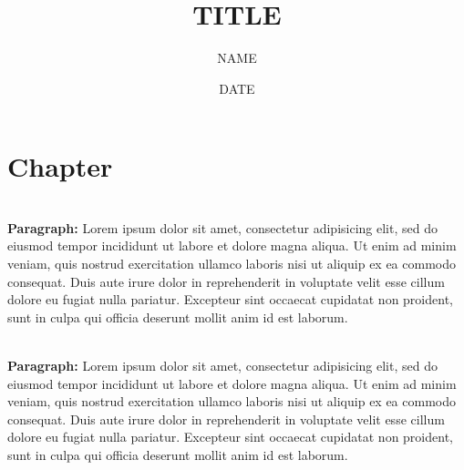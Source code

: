 \documentclass[a5paper, 10pt]{book}
\title{TITLE}
\author{NAME}
\date{DATE}
\newif\ifBgUse
\renewcommand\maketitle[0]{


\fontsize{11pt}{11pt}\selectfont

\tableofcontents
}
\renewcommand{\paragraph}[1]{\mbox{}\\ \textbf{#1:} \hspace{0.15em}}
\begin{document}

    \linespread{1}
	\graphicspath{ {./img/} }

	\renewcommand*\rmdefault{iwona}


	\BgUsefalse

	\maketitle



	\chapter{Chapter}
	\BgUsetrue

	\paragraph{Paragraph} Lorem ipsum dolor sit amet, consectetur adipisicing elit, sed do eiusmod tempor incididunt ut labore et dolore magna aliqua. Ut enim ad minim veniam, quis nostrud exercitation ullamco laboris nisi ut aliquip ex ea commodo consequat. Duis aute irure dolor in reprehenderit in voluptate velit esse cillum dolore eu fugiat nulla pariatur. Excepteur sint occaecat cupidatat non proident, sunt in culpa qui officia deserunt mollit anim id est laborum.

	\paragraph{Paragraph} Lorem ipsum dolor sit amet, consectetur adipisicing elit, sed do eiusmod tempor incididunt ut labore et dolore magna aliqua. Ut enim ad minim veniam, quis nostrud exercitation ullamco laboris nisi ut aliquip ex ea commodo consequat. Duis aute irure dolor in reprehenderit in voluptate velit esse cillum dolore eu fugiat nulla pariatur. Excepteur sint occaecat cupidatat non proident, sunt in culpa qui officia deserunt mollit anim id est laborum.
\end{document}
